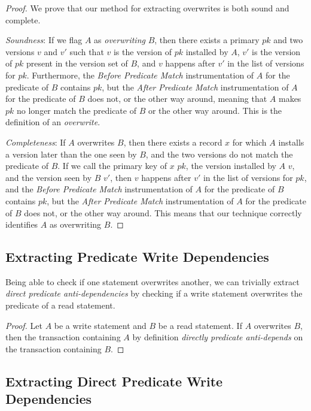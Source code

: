 \begin{proof}
We prove that our method for extracting overwrites is both sound and complete.

\textit{Soundness}: If we flag $A$ as \textit{overwriting} $B$, then there exists a primary $pk$ and two versions $v$ and $v'$ such that $v$ is the version of $pk$ installed by $A$, $v'$ is the version of $pk$ present in the version set of $B$, and $v$ happens after $v'$ in the list of versions for $pk$. Furthermore, the \textit{Before Predicate Match} instrumentation of $A$ for the predicate of $B$ contains $pk$, but the \textit{After Predicate Match} instrumentation of $A$ for the predicate of $B$ does not, or the other way around, meaning that $A$ makes $pk$ no longer match the predicate of $B$ or the other way around. This is the definition of an \textit{overwrite}.

\textit{Completeness}: If $A$ overwrites $B$, then there exists a record $x$ for which $A$ installs a version later than the one seen by $B$, and the two versions do not match the predicate of $B$. If we call the primary key of $x$ $pk$, the version installed by $A$ $v$, and the version seen by $B$ $v'$, then $v$ happens after $v'$ in the list of versions for $pk$, and the \textit{Before Predicate Match} instrumentation of $A$ for the predicate of $B$ contains $pk$, but the \textit{After Predicate Match} instrumentation of $A$ for the predicate of $B$ does not, or the other way around. This means that our technique correctly identifies $A$ as overwriting $B$.
\end{proof}

\subsection{Extracting Predicate Write Dependencies}

Being able to check if one statement overwrites another, we can trivially extract \textit{direct predicate anti-dependencies} by checking if a write statement overwrites the predicate of a read statement.

\begin{proof}
    Let $A$ be a write statement and $B$ be a read statement. If $A$ overwrites $B$, then the transaction containing $A$ by definition \textit{directly predicate anti-depends} on the transaction containing $B$.
\end{proof}

\subsection{Extracting Direct Predicate Write Dependencies}

